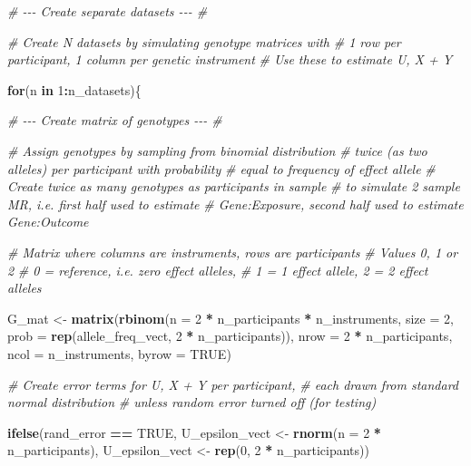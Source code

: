\documentclass[
]{article}
\newenvironment{Shaded}{\begin{snugshade}}{\end{snugshade}}
\newcommand{\AttributeTok}[1]{\textcolor[rgb]{0.13,0.29,0.53}{#1}}
\newcommand{\CommentTok}[1]{\textcolor[rgb]{0.56,0.35,0.01}{\textit{#1}}}
\newcommand{\ConstantTok}[1]{\textcolor[rgb]{0.56,0.35,0.01}{#1}}
\newcommand{\ControlFlowTok}[1]{\textcolor[rgb]{0.13,0.29,0.53}{\textbf{#1}}}
\newcommand{\DecValTok}[1]{\textcolor[rgb]{0.00,0.00,0.81}{#1}}
\newcommand{\FunctionTok}[1]{\textcolor[rgb]{0.13,0.29,0.53}{\textbf{#1}}}
\newcommand{\NormalTok}[1]{#1}
\newcommand{\OtherTok}[1]{\textcolor[rgb]{0.56,0.35,0.01}{#1}}
\newcommand{\SpecialCharTok}[1]{\textcolor[rgb]{0.81,0.36,0.00}{\textbf{#1}}}
\begin{document}
\begin{Shaded}
\begin{Highlighting}[]
  \CommentTok{\# {-}{-}{-} Create separate datasets {-}{-}{-} \#}
  
  \CommentTok{\# Create N datasets by simulating genotype matrices with}
  \CommentTok{\# 1 row per participant, 1 column per genetic instrument}
  \CommentTok{\# Use these to estimate U, X + Y}
  
  \ControlFlowTok{for}\NormalTok{(n }\ControlFlowTok{in} \DecValTok{1}\SpecialCharTok{:}\NormalTok{n\_datasets)\{}
    
    \CommentTok{\# {-}{-}{-} Create matrix of genotypes {-}{-}{-} \#}
    
    \CommentTok{\# Assign genotypes by sampling from binomial distribution}
    \CommentTok{\# twice (as two alleles) per participant with probability}
    \CommentTok{\# equal to frequency of effect allele}
    \CommentTok{\# Create twice as many genotypes as participants in sample}
    \CommentTok{\# to simulate 2 sample MR, i.e. first half used to estimate}
    \CommentTok{\# Gene:Exposure, second half used to estimate Gene:Outcome}
    
    \CommentTok{\# Matrix where columns are instruments, rows are participants}
    \CommentTok{\# Values 0, 1 or 2}
    \CommentTok{\# 0 = reference, i.e. zero effect alleles, }
    \CommentTok{\# 1 = 1 effect allele, 2 = 2 effect alleles }
    
\NormalTok{    G\_mat }\OtherTok{\textless{}{-}} \FunctionTok{matrix}\NormalTok{(}\FunctionTok{rbinom}\NormalTok{(}\AttributeTok{n =} \DecValTok{2} \SpecialCharTok{*}\NormalTok{ n\_participants }\SpecialCharTok{*}\NormalTok{ n\_instruments,}
                           \AttributeTok{size =} \DecValTok{2}\NormalTok{,}
                           \AttributeTok{prob =} \FunctionTok{rep}\NormalTok{(allele\_freq\_vect, }\DecValTok{2} \SpecialCharTok{*}\NormalTok{ n\_participants)),}
                    \AttributeTok{nrow =} \DecValTok{2} \SpecialCharTok{*}\NormalTok{ n\_participants,}
                    \AttributeTok{ncol =}\NormalTok{ n\_instruments,}
                    \AttributeTok{byrow =} \ConstantTok{TRUE}\NormalTok{)}
    
    
    \CommentTok{\# Create error terms for U, X + Y per participant,}
    \CommentTok{\# each drawn from standard normal distribution}
    \CommentTok{\# unless random error turned off (for testing)}
    
    \FunctionTok{ifelse}\NormalTok{(rand\_error }\SpecialCharTok{==} \ConstantTok{TRUE}\NormalTok{,}
\NormalTok{           U\_epsilon\_vect }\OtherTok{\textless{}{-}} \FunctionTok{rnorm}\NormalTok{(}\AttributeTok{n =} \DecValTok{2} \SpecialCharTok{*}\NormalTok{ n\_participants),}
\NormalTok{           U\_epsilon\_vect }\OtherTok{\textless{}{-}} \FunctionTok{rep}\NormalTok{(}\DecValTok{0}\NormalTok{, }\DecValTok{2} \SpecialCharTok{*}\NormalTok{ n\_participants))}
    

\end{Highlighting}
\end{Shaded}
\end{document}
